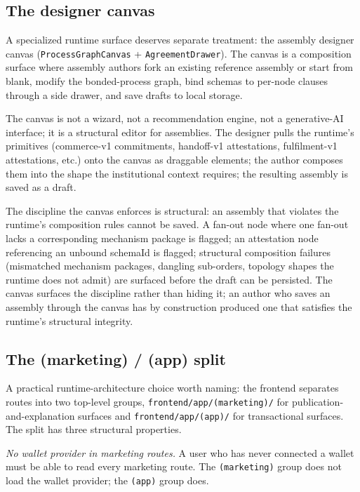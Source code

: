 \documentclass[11pt,a4paper]{article}
\theoremstyle{definition}
\theoremstyle{remark}
\begin{document}
\subsection{The designer canvas}

A specialized runtime surface deserves separate treatment: the
assembly designer canvas (\texttt{ProcessGraphCanvas} +
\texttt{AgreementDrawer}). The canvas is a composition surface
where assembly authors fork an existing reference assembly or
start from blank, modify the bonded-process graph, bind schemas
to per-node clauses through a side drawer, and save drafts to
local storage.

The canvas is not a wizard, not a recommendation engine, not a
generative-AI interface; it is a structural editor for assemblies.
The designer pulls the runtime's primitives (commerce-v1 commitments,
handoff-v1 attestations, fulfilment-v1 attestations, etc.) onto the
canvas as draggable elements; the author composes them into the
shape the institutional context requires; the resulting assembly is
saved as a draft.

The discipline the canvas enforces is structural: an assembly that
violates the runtime's composition rules cannot be saved. A
fan-out node where one fan-out lacks a corresponding mechanism
package is flagged; an attestation node referencing an unbound
schemaId is flagged; structural composition failures (mismatched
mechanism packages, dangling sub-orders, topology shapes the
runtime does not admit) are surfaced before the draft can be
persisted. The canvas surfaces the
discipline rather than hiding it; an author who saves an assembly
through the canvas has by construction produced one that satisfies
the runtime's structural integrity.

\subsection{The (marketing) / (app) split}

A practical runtime-architecture choice worth naming: the frontend
separates routes into two top-level groups,
\texttt{frontend/app/(marketing)/} for publication-and-explanation
surfaces and \texttt{frontend/app/(app)/} for transactional
surfaces. The split has three structural properties.

\emph{No wallet provider in marketing routes.} A user who has never
connected a wallet must be able to read every marketing route. The
\texttt{(marketing)} group does not load the wallet provider; the
\texttt{(app)} group does.
\end{document}
